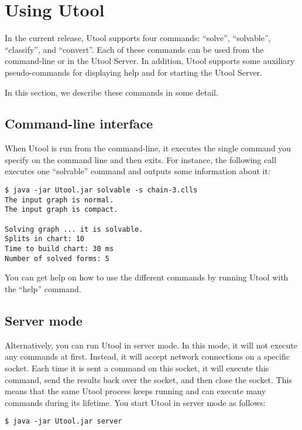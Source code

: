 \section{Using Utool}  \label{sec:operations}

In the current release, Utool supports four commands: ``solve'',
``solvable'', ``classify'', and ``convert''. Each of these commands
can be used from the command-line or in the Utool Server. In addition,
Utool supports some auxiliary pseudo-commands for displaying help and
for starting the Utool Server.

In this section, we describe these commands in some detail.


\subsection{Command-line interface}
When Utool is run from the command-line, it executes the single
command you specify on the command line and then exits. For instance,
the following call executes one ``solvable'' command and outputs some
information about it:

\begin{verbatim}
$ java -jar Utool.jar solvable -s chain-3.clls
The input graph is normal.
The input graph is compact.

Solving graph ... it is solvable.
Splits in chart: 10
Time to build chart: 30 ms
Number of solved forms: 5
\end{verbatim}

You can get help on how to use the different commands by running Utool
with the ``help'' command.


\subsection{Server mode}

Alternatively, you can run Utool in server mode. In this mode, it will
not execute any commands at first. Instead, it will accept network
connections on a specific socket. Each time it is sent a command on
this socket, it will execute this command, send the results back over
the socket, and then close the socket. This means that the same Utool
process keeps running and can execute many commands during its
lifetime. You start Utool in server mode as follows:

\begin{verbatim}
$ java -jar Utool.jar server
\end{verbatim}

